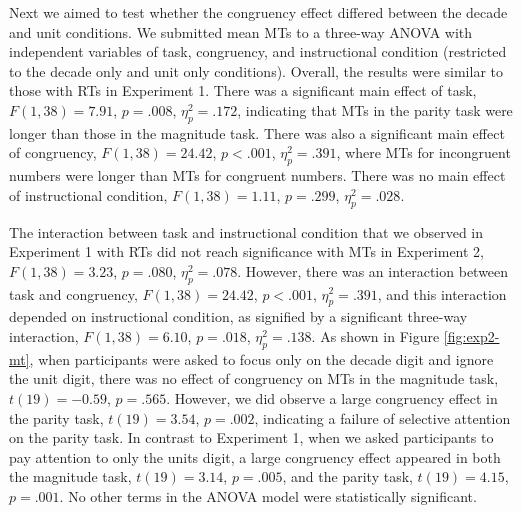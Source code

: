 \documentclass[english,man]{apa6}
\theoremstyle{definition}
\theoremstyle{definition}
\theoremstyle{definition}
\theoremstyle{remark}
\begin{document}
Next we aimed to test whether the congruency effect differed between the
decade and unit conditions. We submitted mean MTs to a three-way ANOVA
with independent variables of task, congruency, and instructional
condition (restricted to the decade only and unit only conditions).
Overall, the results were similar to those with RTs in Experiment 1.
There was a significant main effect of task, \(F(1, 38) = 7.91\),
\(p = .008\), \(\eta^2_p = .172\), indicating that MTs in the parity
task were longer than those in the magnitude task. There was also a
significant main effect of congruency, \(F(1, 38) = 24.42\),
\(p < .001\), \(\eta^2_p = .391\), where MTs for incongruent numbers
were longer than MTs for congruent numbers. There was no main effect of
instructional condition, \(F(1, 38) = 1.11\), \(p = .299\),
\(\eta^2_p = .028\).

The interaction between task and instructional condition that we
observed in Experiment 1 with RTs did not reach significance with MTs in
Experiment 2, \(F(1, 38) = 3.23\), \(p = .080\), \(\eta^2_p = .078\).
However, there was an interaction between task and congruency,
\(F(1, 38) = 24.42\), \(p < .001\), \(\eta^2_p = .391\), and this
interaction depended on instructional condition, as signified by a
significant three-way interaction, \(F(1, 38) = 6.10\), \(p = .018\),
\(\eta^2_p = .138\). As shown in Figure \ref{fig:exp2-mt}, when
participants were asked to focus only on the decade digit and ignore the
unit digit, there was no effect of congruency on MTs in the magnitude
task, \(t(19) = -0.59\), \(p = .565\). However, we did observe a large
congruency effect in the parity task, \(t(19) = 3.54\), \(p = .002\),
indicating a failure of selective attention on the parity task. In
contrast to Experiment 1, when we asked participants to pay attention to
only the units digit, a large congruency effect appeared in both the
magnitude task, \(t(19) = 3.14\), \(p = .005\), and the parity task,
\(t(19) = 4.15\), \(p = .001\). No other terms in the ANOVA model were
statistically significant.
\end{document}
